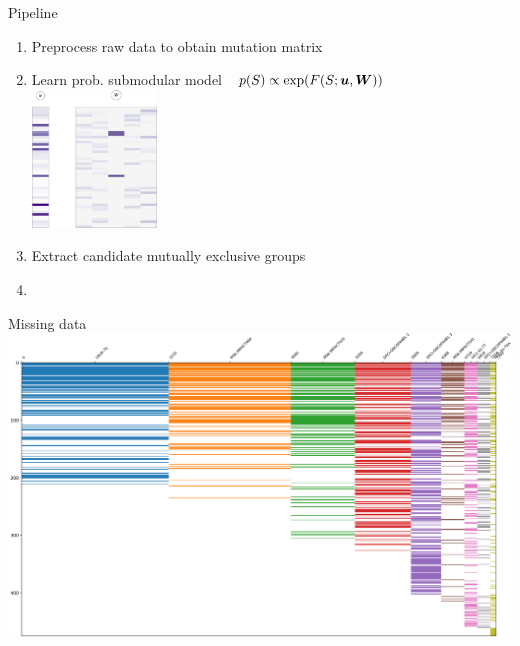 \documentclass[mathserif]{beamer}
\begin{document}
\begin{frame}{Pipeline}
\begin{enumerate}
  \item Preprocess raw data to obtain mutation matrix 
  \vspace{1em}
  \item Learn prob. submodular model $\ \ p(S) \propto \exp(F(S; \bm{u}, \bm{W}))$\\[0.5em]
  \includegraphics[width=1.3in]{figures/mat_old_reg.pdf}
  \vspace{1em}
  \item Extract candidate mutually exclusive groups
  \vspace{1em}
  \item {}
\end{enumerate}
\end{frame}

\begin{frame}{Missing data}
  \centering
  \includegraphics[width=\textwidth]{figures/brca_panels_9.pdf}
\end{frame}
\end{document}
